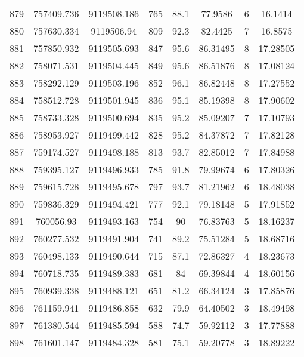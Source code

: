 \begin{longtable}{cccccccc}
879  & 757409.736      & 9119508.186      & 765     & 88.1  & 77.9586  & 6  & 16.1414  \\
880  & 757630.334      & 9119506.94       & 809     & 92.3  & 82.4425  & 7  & 16.8575  \\
881  & 757850.932      & 9119505.693      & 847     & 95.6  & 86.31495 & 8  & 17.28505 \\
882  & 758071.531      & 9119504.445      & 849     & 95.6  & 86.51876 & 8  & 17.08124 \\
883  & 758292.129      & 9119503.196      & 852     & 96.1  & 86.82448 & 8  & 17.27552 \\
884  & 758512.728      & 9119501.945      & 836     & 95.1  & 85.19398 & 8  & 17.90602 \\
885  & 758733.328      & 9119500.694      & 835     & 95.2  & 85.09207 & 7  & 17.10793 \\
886  & 758953.927      & 9119499.442      & 828     & 95.2  & 84.37872 & 7  & 17.82128 \\
887  & 759174.527      & 9119498.188      & 813     & 93.7  & 82.85012 & 7  & 17.84988 \\
888  & 759395.127      & 9119496.933      & 785     & 91.8  & 79.99674 & 6  & 17.80326 \\
889  & 759615.728      & 9119495.678      & 797     & 93.7  & 81.21962 & 6  & 18.48038 \\
890  & 759836.329      & 9119494.421      & 777     & 92.1  & 79.18148 & 5  & 17.91852 \\
891  & 760056.93       & 9119493.163      & 754     & 90    & 76.83763 & 5  & 18.16237 \\
892  & 760277.532      & 9119491.904      & 741     & 89.2  & 75.51284 & 5  & 18.68716 \\
893  & 760498.133      & 9119490.644      & 715     & 87.1  & 72.86327 & 4  & 18.23673 \\
894  & 760718.735      & 9119489.383      & 681     & 84    & 69.39844 & 4  & 18.60156 \\
895  & 760939.338      & 9119488.121      & 651     & 81.2  & 66.34124 & 3  & 17.85876 \\
896  & 761159.941      & 9119486.858      & 632     & 79.9  & 64.40502 & 3  & 18.49498 \\
897  & 761380.544      & 9119485.594      & 588     & 74.7  & 59.92112 & 3  & 17.77888 \\
898  & 761601.147      & 9119484.328      & 581     & 75.1  & 59.20778 & 3  & 18.89222 \\

\end{longtable}

